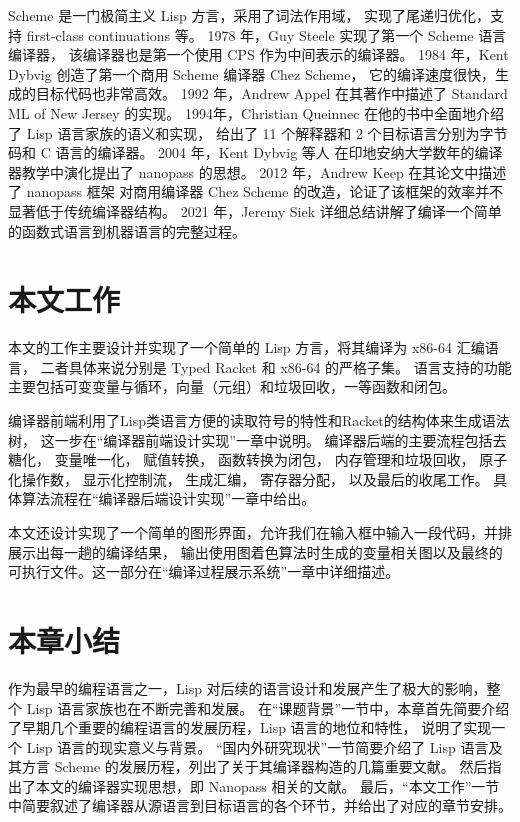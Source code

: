 Scheme 是一门极简主义 Lisp 方言，采用了词法作用域，
实现了尾递归优化，支持 first-class continuations 等。
1978 年，Guy Steele\cite{Steele_1978} 实现了第一个 Scheme 语言编译器，
该编译器也是第一个使用 CPS 作为中间表示的编译器。
1984 年，Kent Dybvig 创造了第一个商用 Scheme 编译器 Chez Scheme\cite{Dybvig_2006}，
它的编译速度很快，生成的目标代码也非常高效。
1992 年，Andrew Appel\cite{Appel_1992} 在其著作中描述了 Standard ML of New Jersey 的实现。
1994年，Christian Queinnec\cite{Queinnec_1996} 在他的书中全面地介绍了 Lisp 语言家族的语义和实现，
给出了 11 个解释器和 2 个目标语言分别为字节码和 C 语言的编译器。
2004 年，Kent Dybvig 等人\cite{Sarkar_Waddell_Dybvig_2004}
在印地安纳大学数年的编译器教学中演化提出了 nanopass 的思想。
2012 年，Andrew Keep\cite{Keep_Dybvig_2013} 在其论文中描述了 nanopass 框架
对商用编译器 Chez Scheme 的改造，论证了该框架的效率并不显著低于传统编译器结构。
2021 年，Jeremy Siek\cite{Siek_2022} 详细总结讲解了编译一个简单的函数式语言到机器语言的完整过程。

\section{本文工作}

本文的工作主要设计并实现了一个简单的 Lisp 方言，将其编译为 x86-64 汇编语言，
二者具体来说分别是 Typed Racket 和 x86-64 的严格子集。
语言支持的功能主要包括可变变量与循环，向量（元组）和垃圾回收，一等函数和闭包。

编译器前端利用了Lisp类语言方便的读取符号的特性和Racket的结构体来生成语法树，
这一步在“编译器前端设计实现”一章中说明。
编译器后端的主要流程包括去糖化，
变量唯一化，
赋值转换，
函数转换为闭包，
内存管理和垃圾回收，
原子化操作数，
显示化控制流，
生成汇编，
寄存器分配，
以及最后的收尾工作。
具体算法流程在“编译器后端设计实现”一章中给出。

本文还设计实现了一个简单的图形界面，允许我们在输入框中输入一段代码，并排展示出每一趟的编译结果，
输出使用图着色算法时生成的变量相关图以及最终的可执行文件。这一部分在“编译过程展示系统”一章中详细描述。

\section{本章小结}

作为最早的编程语言之一，Lisp 对后续的语言设计和发展产生了极大的影响，整个 Lisp 语言家族也在不断完善和发展。
在“课题背景”一节中，本章首先简要介绍了早期几个重要的编程语言的发展历程，Lisp 语言的地位和特性，
说明了实现一个 Lisp 语言的现实意义与背景。
“国内外研究现状”一节简要介绍了 Lisp 语言及其方言 Scheme 的发展历程，列出了关于其编译器构造的几篇重要文献。
然后指出了本文的编译器实现思想，即 Nanopass 相关的文献。
最后，“本文工作”一节中简要叙述了编译器从源语言到目标语言的各个环节，并给出了对应的章节安排。
